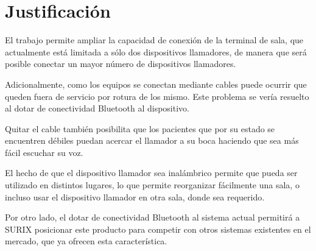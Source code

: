 
\section{Justificación}

El trabajo permite ampliar la capacidad de conexión de la terminal de sala, que actualmente está limitada a sólo dos dispositivos llamadores, de manera que será posible conectar un mayor número de dispositivos llamadores.

Adicionalmente, como los equipos se conectan mediante cables puede ocurrir que queden fuera de servicio por rotura de los mismo. Este problema se vería resuelto al dotar de conectividad Bluetooth al dispositivo.

Quitar el cable también posibilita que los pacientes que por su estado se encuentren débiles puedan acercar el llamador a su boca haciendo que sea más fácil escuchar su voz.

El hecho de que el dispositivo llamador sea inalámbrico permite que pueda ser utilizado en distintos lugares, lo que permite reorganizar fácilmente una sala, o incluso usar el dispositivo llamador en otra sala, donde sea requerido.

Por otro lado, el dotar de conectividad Bluetooth al sistema actual permitirá a SURIX posicionar este producto para competir con otros sistemas existentes en el mercado, que ya ofrecen esta característica.
